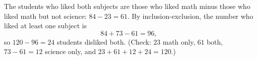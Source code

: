 The students who liked both subjects are those who liked math minus those who liked math but not science: $84-23=61$. By inclusion-exclusion, the number who liked at least one subject is
\[
84+73-61=96,
\]
so $120-96=\boxed{24}$ students disliked both. (Check: $23$ math only, $61$ both, $73-61=12$ science only, and $23+61+12+24=120$.)
